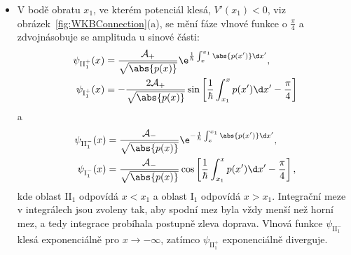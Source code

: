 \begin{itemize}
\item
    V bodě obratu $x_{1}$, ve kterém potenciál klesá, $V'(x_{1})<0$, viz obrázek~\ref{fig:WKBConnection}(a), se mění fáze vlnové funkce o $\frac{\pi}{4}$ a zdvojnásobuje se amplituda u sinové části:
    \begin{subequations}
        \begin{align}
            \psi_{\mathrm{II}_{1}^{+}}(x)&=\frac{\mathcal{A}_{+}}{\sqrt{\abs{p(x)}}}\e^{\frac{1}{\hbar}\int_{x}^{x_{1}}\abs{p(x')}\d x'},\\
            \psi_{\mathrm{I}_{1}^{+}}(x)&=-\frac{2\mathcal{A}_{+}}{\sqrt{\abs{p(x)}}}\sin\left[\frac{1}{\hbar}\int_{x_{1}}^{x}p(x')\d x'-\frac{\pi}{4}\right]
        \end{align}            
        \label{eq:WKBConnectionDown1}
    \end{subequations}
    a
    \begin{subequations}
        \begin{align}
            \psi_{\mathrm{II}_{1}^{-}}(x)&=\frac{\mathcal{A}_{-}}{\sqrt{\abs{p(x)}}}\e^{-\frac{1}{\hbar}\int_{x}^{x_{1}}\abs{p(x')}\d x'},\\
            \psi_{\mathrm{I}_{1}^{-}}(x)&=\frac{\mathcal{A}_{-}}{\sqrt{\abs{p(x)}}}\cos\left[\frac{1}{\hbar}\int_{x_{1}}^{x}p(x')\d x'-\frac{\pi}{4}\right],
        \end{align}		            
        \label{eq:WKBConnectionDown2}
    \end{subequations}
    kde oblast II$_{1}$ odpovídá $x<x_{1}$ a oblast I$_{1}$ odpovídá $x>x_{1}$.
    Integrační meze v integrálech jsou zvoleny tak, aby spodní mez byla vždy menší než horní mez, a tedy integrace probíhala postupně zleva doprava.
    Vlnová funkce $\psi_{\mathrm{II}_{1}^{-}}$ klesá exponenciálně pro $x\rightarrow-\infty$, zatímco $\psi_{\mathrm{II}_{1}^{+}}$ exponenciálně diverguje.
    

\end{itemize}
